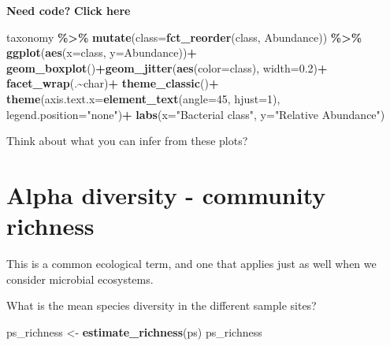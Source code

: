 \documentclass[
]{book}
\newenvironment{Shaded}{\begin{snugshade}}{\end{snugshade}}
\newcommand{\AttributeTok}[1]{\textcolor[rgb]{0.13,0.29,0.53}{#1}}
\newcommand{\DecValTok}[1]{\textcolor[rgb]{0.00,0.00,0.81}{#1}}
\newcommand{\FloatTok}[1]{\textcolor[rgb]{0.00,0.00,0.81}{#1}}
\newcommand{\FunctionTok}[1]{\textcolor[rgb]{0.13,0.29,0.53}{\textbf{#1}}}
\newcommand{\NormalTok}[1]{#1}
\newcommand{\OtherTok}[1]{\textcolor[rgb]{0.56,0.35,0.01}{#1}}
\newcommand{\SpecialCharTok}[1]{\textcolor[rgb]{0.81,0.36,0.00}{\textbf{#1}}}
\newcommand{\StringTok}[1]{\textcolor[rgb]{0.31,0.60,0.02}{#1}}
\begin{document}
\hypertarget{box}{}
\textbf{Need code?}
\textbf{Click here}

\begin{Shaded}
\begin{Highlighting}[]
\NormalTok{taxonomy }\SpecialCharTok{\%\textgreater{}\%} 
  \FunctionTok{mutate}\NormalTok{(}\AttributeTok{class=}\FunctionTok{fct\_reorder}\NormalTok{(class, Abundance)) }\SpecialCharTok{\%\textgreater{}\%} 
  \FunctionTok{ggplot}\NormalTok{(}\FunctionTok{aes}\NormalTok{(}\AttributeTok{x=}\NormalTok{class, }\AttributeTok{y=}\NormalTok{Abundance))}\SpecialCharTok{+}
  \FunctionTok{geom\_boxplot}\NormalTok{()}\SpecialCharTok{+}\FunctionTok{geom\_jitter}\NormalTok{(}\FunctionTok{aes}\NormalTok{(}\AttributeTok{color=}\NormalTok{class), }\AttributeTok{width=}\FloatTok{0.2}\NormalTok{)}\SpecialCharTok{+}
  \FunctionTok{facet\_wrap}\NormalTok{(.}\SpecialCharTok{\textasciitilde{}}\NormalTok{char)}\SpecialCharTok{+}
  \FunctionTok{theme\_classic}\NormalTok{()}\SpecialCharTok{+}
  \FunctionTok{theme}\NormalTok{(}\AttributeTok{axis.text.x=}\FunctionTok{element\_text}\NormalTok{(}\AttributeTok{angle=}\DecValTok{45}\NormalTok{, }\AttributeTok{hjust=}\DecValTok{1}\NormalTok{), }\AttributeTok{legend.position=}\StringTok{"none"}\NormalTok{)}\SpecialCharTok{+}
  \FunctionTok{labs}\NormalTok{(}\AttributeTok{x=}\StringTok{"Bacterial class"}\NormalTok{, }\AttributeTok{y=}\StringTok{"Relative Abundance"}\NormalTok{)}
\end{Highlighting}
\end{Shaded}

Think about what you can infer from these plots?

\hypertarget{alpha-diversity---community-richness}{%
\section{Alpha diversity - community richness}\label{alpha-diversity---community-richness}}

This is a common ecological term, and one that applies just as well when we consider microbial ecosystems.

What is the mean species diversity in the different sample sites?

\begin{Shaded}
\begin{Highlighting}[]
\NormalTok{ps\_richness }\OtherTok{\textless{}{-}} \FunctionTok{estimate\_richness}\NormalTok{(ps)}
\NormalTok{ps\_richness}
\end{Highlighting}
\end{Shaded}
\end{document}
